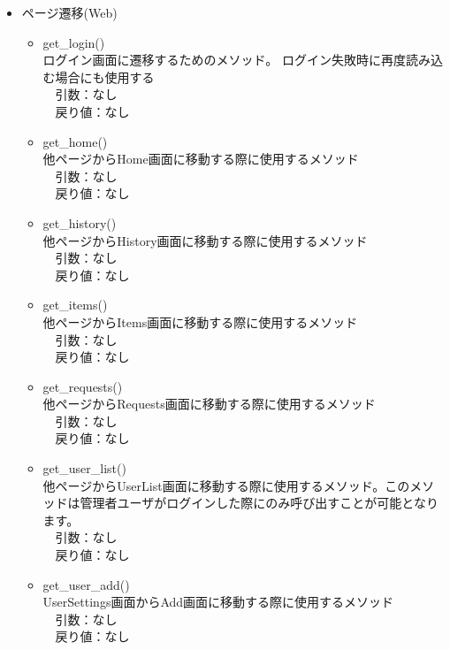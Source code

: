 \documentclass[a4, dvipdfmx, uplatex]{jsarticle}
\begin{document}
\begin{itemize}
\item ページ遷移(Web)　\\

\begin{itemize}
\item get\_login() \\
ログイン画面に遷移するためのメソッド。
ログイン失敗時に再度読み込む場合にも使用する \\
　引数：なし \\
　戻り値：なし \\

\item get\_home() \\
他ページからHome画面に移動する際に使用するメソッド \\
　引数：なし \\
　戻り値：なし \\

\item get\_history() \\
他ページからHistory画面に移動する際に使用するメソッド \\
　引数：なし \\
　戻り値：なし \\

\item get\_items() \\
他ページからItems画面に移動する際に使用するメソッド \\
　引数：なし \\
　戻り値：なし \\

\item get\_requests() \\
他ページからRequests画面に移動する際に使用するメソッド \\
　引数：なし \\
　戻り値：なし \\

\item get\_user\_list() \\
他ページからUserList画面に移動する際に使用するメソッド。このメソッドは管理者ユーザがログインした際にのみ呼び出すことが可能となります。\\
　引数：なし \\
　戻り値：なし \\

\item get\_user\_add() \\
UserSettings画面からAdd画面に移動する際に使用するメソッド \\
　引数：なし \\
　戻り値：なし \\


\end{itemize}
\end{itemize}
\end{document}

